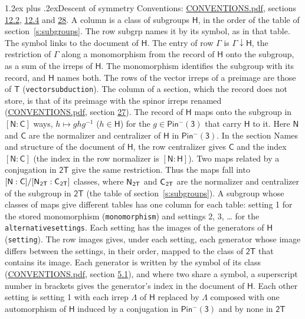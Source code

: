 \documentclass[10pt,a4paper]{article}
\makeatletter
\renewcommand\section{\@startsection{section}{1}{\z@}{-3ex plus -1ex minus -.2ex}%
  {1.2ex plus .2ex}{\normalfont\large\sffamily\bfseries\color{parttitle}}}
\numberwithin{equation}{section}
\newcommand{\grp}[1]{\mathsf{#1}}
\newcommand{\grpindex}[2]{[#1 : #2]}
\newcommand{\restr}[2]{#1\!\downarrow#2}
\newcommand{\hairsp}{\mkern1mu}
\makeatother
\begin{document}
\section{Descent of symmetry}\label{s:subduction}
Conventions: \href{../../CONVENTIONS.pdf}{CONVENTIONS.pdf}, sections \href{../../../rotation/CONVENTIONS.pdf\#conv.12.2}{12.2}, \href{../../../rotation/CONVENTIONS.pdf\#conv.12.4}{12.4} and \href{../../CONVENTIONS.pdf\#conv.28}{28}.
A column is a class of subgroups $\grp{H}$, in the order of the table of section~\ref{s:subgroups}. The row subgrp names it by its symbol, as in that table. The symbol links to the document of $\grp{H}$. The entry of row $\Gamma$ is $\restr{\Gamma}{\grp{H}}$, the restriction of $\Gamma$ along a monomorphism from the record of $\grp{H}$ onto the subgroup, as a sum of the irreps of $\grp{H}$. The monomorphism identifies the subgroup with its record, and $\grp{H}$ names both. The rows of the vector irreps of a preimage are those of \href{../../../rotation/data/pdf/T.pdf}{$\grp{T}$} (\texttt{vectorsubduction}). The column of a section, which the record does not store, is that of its preimage with the spinor irreps renamed (\href{../../CONVENTIONS.pdf}{CONVENTIONS.pdf}, section \href{../../CONVENTIONS.pdf\#conv.27}{27}). \label{n:group.normalizer.o3}\label{n:group.centralizer.o3}\label{n:element.h}The record of $\grp{H}$ maps onto the subgroup in $\grpindex{\grp{N}}{\grp{C}}$ ways, $h \mapsto g h g^{-1}$ ($h \in \grp{H}$) for the $g \in \grp{Pin^{-}(3)}$ that carry $\grp{H}$ to it. Here $\grp{N}$ and $\grp{C}$ are the normalizer and centralizer of $\grp{H}$ in \href{Pinminus3.pdf}{$\grp{Pin^{-}(3)}$}. In the section Names and structure of the document of $\grp{H}$, the row centralizer gives $\grp{C}$ and the index $\grpindex{\grp{N}}{\grp{C}}$ (the index in the row normalizer is $\grpindex{\grp{N}}{\grp{H}}$). Two maps related by a conjugation in $\grp{2T}$ give the same restriction. Thus the maps fall into $\grpindex{\grp{N}}{\grp{C}}/\grpindex{\grp{N}_{\hairsp \grp{2T}}}{\grp{C}_{\hairsp \grp{2T}}}$ classes, where $\grp{N}_{\hairsp \grp{2T}}$ and $\grp{C}_{\hairsp \grp{2T}}$ are the normalizer and centralizer of the subgroup in $\grp{2T}$ (the table of section~\ref{s:subgroups}). \label{n:head.setting}A subgroup whose classes of maps give different tables has one column for each table: setting 1 for the stored monomorphism (\texttt{monomorphism}) and settings 2, 3, \dots{} for the \texttt{alternativesettings}. Each setting has the images of the generators of $\grp{H}$ (\texttt{setting}). \label{n:head.images}The row images gives, under each setting, each generator whose image differs between the settings, in their order, mapped to the class of $\grp{2T}$ that contains its image. Each generator is written by the symbol of its class (\href{../../CONVENTIONS.pdf}{CONVENTIONS.pdf}, section \href{../../../rotation/CONVENTIONS.pdf\#conv.5.1}{5.1}), and where two share a symbol, a superscript number in brackets gives the generator's index in the document of $\grp{H}$. \label{n:irrep.Delta}Each other setting is setting 1 with each irrep $\Lambda$ of $\grp{H}$ replaced by $\Lambda$ composed with one automorphism of $\grp{H}$ induced by a conjugation in \href{Pinminus3.pdf}{$\grp{Pin^{-}(3)}$} and by none in $\grp{2T}$ 
\end{document}
